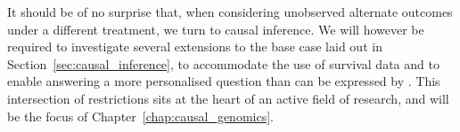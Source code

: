 \documentclass[thesis.tex]{subfiles}
\begin{document}
It should be of no surprise that, when considering unobserved alternate outcomes under a different treatment, we turn to causal inference. We will however be required to investigate several extensions to the base case laid out in Section~\ref{sec:causal_inference}, to accommodate the use of survival data and to enable answering a more personalised question than can be expressed by . This intersection of restrictions sits at the heart of an active field of research, and will be the focus of Chapter~\ref{chap:causal_genomics}.  



\end{document}
